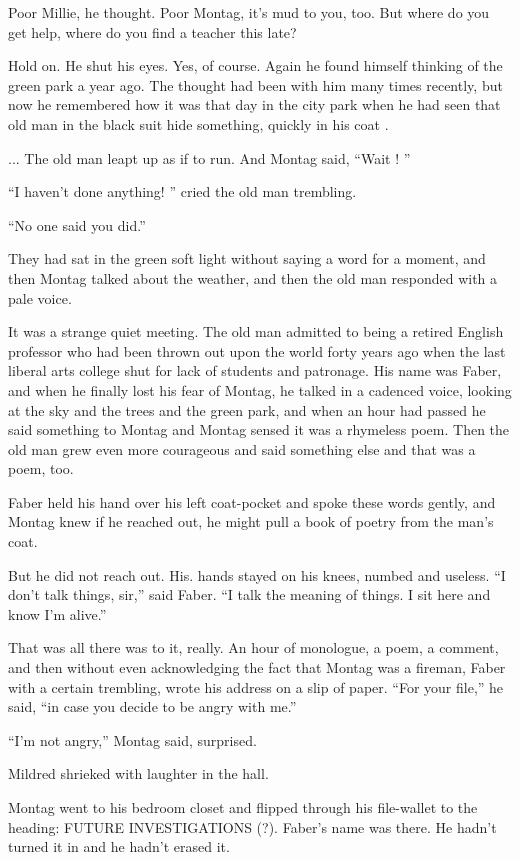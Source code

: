 \documentclass[11pt,openany]{book}
\begin{document}
Poor Millie, he thought. Poor Montag, it's mud to you, too. But where do you get help, where do you find a teacher this late?

Hold on. He shut his eyes. Yes, of course. Again he found himself thinking of the green park a year ago. The thought had been with him many times recently, but now he remembered how it was that day in the city park when he had seen that old man in the black suit hide something, quickly in his coat .

... The old man leapt up as if to run. And Montag said, ``Wait ! ''

``I haven't done anything! '' cried the old man trembling.

``No one said you did.''

They had sat in the green soft light without saying a word for a moment, and then Montag talked about the weather, and then the old man responded with a pale voice.

It was a strange quiet meeting. The old man admitted to being a retired English professor who had been thrown out upon the world forty years ago when the last liberal arts college shut for lack of students and patronage. His name was Faber, and when he finally lost his fear of Montag, he talked in a cadenced voice, looking at the sky and the trees and the green park, and when an hour had passed he said something to Montag and Montag sensed it was a rhymeless poem. Then the old man grew even more courageous and said something else and that was a poem, too.

Faber held his hand over his left coat-pocket and spoke these words gently, and Montag knew if he reached out, he might pull a book of poetry from the man's coat.

But he did not reach out. His. hands stayed on his knees, numbed and useless. ``I don't talk things, sir,'' said Faber. ``I talk the meaning of things. I sit here and know I'm alive.''

That was all there was to it, really. An hour of monologue, a poem, a comment, and then without even acknowledging the fact that Montag was a fireman, Faber with a certain trembling, wrote his address on a slip of paper. ``For your file,'' he said, ``in case you decide to be angry with me.''

``I'm not angry,'' Montag said, surprised.

Mildred shrieked with laughter in the hall.

Montag went to his bedroom closet and flipped through his file-wallet to the heading: FUTURE INVESTIGATIONS (?). Faber's name was there. He hadn't turned it in and he hadn't erased it.
\end{document}
